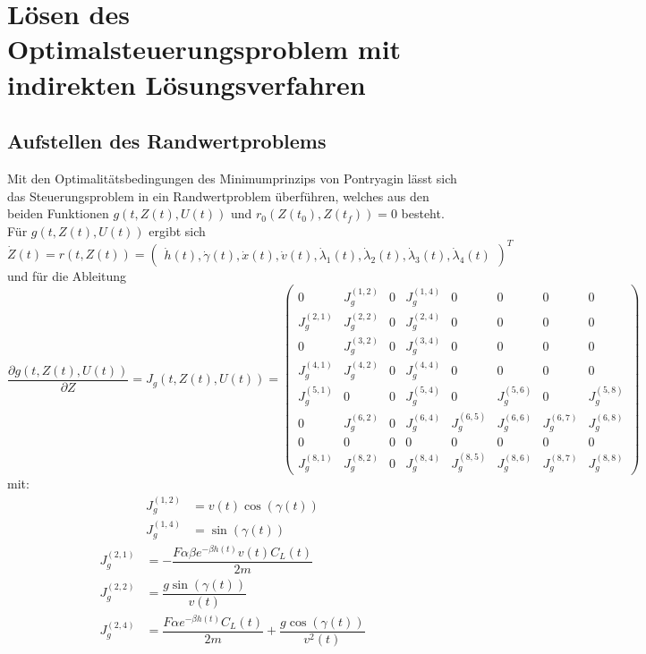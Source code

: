 \chapter{Lösen des Optimalsteuerungsproblem mit indirekten Lösungsverfahren}

\section{Aufstellen des Randwertproblems}
Mit den Optimalitätsbedingungen des Minimumprinzips von Pontryagin lässt sich das Steuerungsproblem in ein Randwertproblem überführen, welches aus den beiden Funktionen $g(t,Z(t),U(t))$ und $r_0(Z(t_0),Z(t_f)) = 0$ besteht. Für $g(t,Z(t),U(t))$ ergibt sich \[\dot{Z}(t) = r(t,Z(t)) = \begin{pmatrix}
\dot{h}(t),\dot{\gamma}(t),\dot{x}(t),\dot{v}(t),\dot{\lambda}_1(t),\dot{\lambda}_2(t),\dot{\lambda}_3(t),\dot{\lambda}_4(t)
\end{pmatrix}^T\]
und für die Ableitung
\[\dfrac{\partial g(t,Z(t),U(t))}{\partial Z} = J_g(t,Z(t),U(t)) = \begin{pmatrix}
0 & J_g^{(1,2)} & 0 & J_g^{(1,4)} & 0 & 0 & 0 & 0 \\ 
J_g^{(2,1)} & J_g^{(2,2)} & 0 & J_g^{(2,4)} & 0 & 0 & 0 & 0 \\ 
0 & J_g^{(3,2)} & 0 & J_g^{(3,4)} & 0 & 0 & 0 & 0 \\ 
J_g^{(4,1)} & J_g^{(4,2)} & 0 & J_g^{(4,4)} & 0 & 0 & 0 & 0 \\
J_g^{(5,1)} & 0 & 0 & J_g^{(5,4)} & 0 & J_g^{(5,6)} & 0 & J_g^{(5,8)} \\
0 & J_g^{(6,2)} & 0 & J_g^{(6,4)} & J_g^{(6,5)} & J_g^{(6,6)} & J_g^{(6,7)} & J_g^{(6,8)} \\
0 & 0 & 0 & 0 & 0 & 0 & 0 & 0 \\
J_g^{(8,1)} & J_g^{(8,2)} & 0 & J_g^{(8,4)} & J_g^{(8,5)} & J_g^{(8,6)} & J_g^{(8,7)} & J_g^{(8,8)}
\end{pmatrix}\]
mit:
\begin{align*}
J_g^{(1,2)} &= v(t) \cos(\gamma(t)) \\
J_g^{(1,4)} &= \sin(\gamma(t))
\end{align*}
\begin{align*}
J_g^{(2,1)} &= - \dfrac{F \alpha \beta e^{-\beta h(t)} v(t) C_L(t)}{2m} \\
J_g^{(2,2)} &= \dfrac{g \sin(\gamma(t))}{v(t)} \\
J_g^{(2,4)} &= \dfrac{F \alpha e^{-\beta h(t)} C_L(t)}{2m} + \dfrac{g \cos(\gamma(t))}{v^2(t)}
\end{align*}
